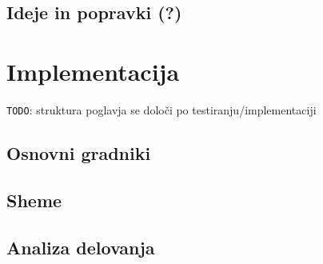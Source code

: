\documentclass[a4paper, 11pt]{article}
\newcommand{\todo}{\texttt{TODO}} %
\begin{document}
\subsection{Ideje in popravki (?)}



\section{Implementacija}

\todo: struktura poglavja se določi po testiranju/implementaciji

\subsection{Osnovni gradniki}

\subsection{Sheme}

\subsection{Analiza delovanja}




 
\end{document}

